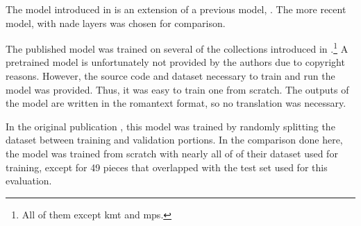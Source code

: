 
The model introduced in \textcite{micchi2021deep} is an
extension of a previous model, \textcite{micchi2020not}. The
more recent model, with \gls{nade} layers was chosen for
comparison.

The published model was trained on several of the
collections introduced in
.\footnote{All of
them except \gls{kmt} and \gls{mps}.} A pretrained model is
unfortunately not provided by the authors due to copyright
reasons. However, the source code and dataset necessary to
train and run the model was provided. Thus, it was easy to
train one from scratch. The outputs of the model are written
in the \gls{romantext} format, so no translation was
necessary. 

In the original publication \parencite{micchi2021deep}, this
model was trained by randomly splitting the dataset between
training and validation portions. In the comparison done
here, the model was trained from scratch with nearly all of
of their dataset used for training, except for 49 pieces
that overlapped with the test set used for this evaluation.
